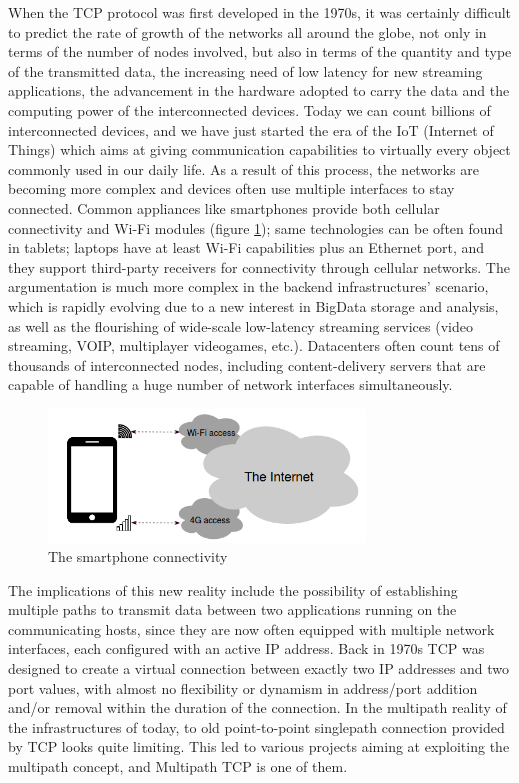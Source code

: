 When the TCP protocol was first developed in the 1970s, it was certainly difficult to predict the rate of growth of the networks all around the globe, not only in terms of the number of nodes involved, but also in terms of the quantity and type of the transmitted data, the increasing need of low latency for new streaming applications, the advancement in the hardware adopted to carry the data and the computing power of the interconnected devices. Today we can count billions of interconnected devices, and we have just started the era of the IoT (Internet of Things) which aims at giving communication capabilities to virtually every object commonly used in our daily life.
As a result of this process, the networks are becoming more complex and devices often use multiple interfaces to stay connected. Common appliances like smartphones provide both cellular connectivity and Wi-Fi modules (figure \ref{fig:smartphones}); same technologies can be often found in tablets; laptops have at least Wi-Fi capabilities plus an Ethernet port, and they support third-party receivers for connectivity through cellular networks. The argumentation is much more complex in the backend infrastructures' scenario, which is rapidly evolving due to a new interest in BigData storage and analysis, as well as the flourishing of wide-scale low-latency streaming services (video streaming, VOIP, multiplayer videogames, etc.). Datacenters often count tens of thousands of interconnected nodes, including content-delivery servers that are capable of handling a huge number of network interfaces simultaneously.

\begin{figure}[!htb]
\centering
\includegraphics[width=0.75\textwidth]{images/smartphones}
\caption{The smartphone connectivity}
\label{fig:smartphones}
\end{figure}

The implications of this new reality include the possibility of establishing multiple paths to transmit data between two applications running on the communicating hosts, since they are now often equipped with multiple network interfaces, each configured with an active IP address. Back in 1970s TCP was designed to create a virtual connection between exactly two IP addresses and two port values, with almost no flexibility or dynamism in address/port addition and/or removal within the duration of the connection. In the multipath reality of the infrastructures of today, to old point-to-point singlepath connection provided by TCP looks quite limiting. This led to various projects aiming at exploiting the multipath concept, and Multipath TCP is one of them.


